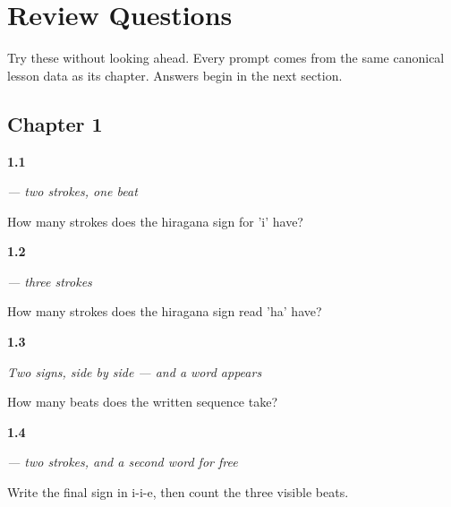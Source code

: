 
\chapter*{Review Questions}

Try these without looking ahead. Every prompt comes from the same canonical lesson data as its chapter. Answers begin in the next section.

\section*{Chapter 1}

\noindent\begin{minipage}[t]{\linewidth}
\raggedright
\hypertarget{review-JA-W01-i-strokes}{\textbf{1.1}} \emph{ — two strokes, one beat}\par
\small How many strokes does the hiragana sign for 'i' have?
\end{minipage}\par\medskip

\noindent\begin{minipage}[t]{\linewidth}
\raggedright
\hypertarget{review-JA-W01-ha-strokes}{\textbf{1.2}} \emph{ — three strokes}\par
\small How many strokes does the hiragana sign read 'ha' have?
\end{minipage}\par\medskip

\noindent\begin{minipage}[t]{\linewidth}
\raggedright
\hypertarget{review-JA-W01-hai-read-beats}{\textbf{1.3}} \emph{Two signs, side by side — and a word appears}\par
\small How many beats does the written sequence  take?
\end{minipage}\par\medskip

\noindent\begin{minipage}[t]{\linewidth}
\raggedright
\hypertarget{review-JA-W01-e-beats}{\textbf{1.4}} \emph{ — two strokes, and a second word for free}\par
\small Write the final sign in i-i-e, then count the three visible beats.
\end{minipage}\par\medskip

